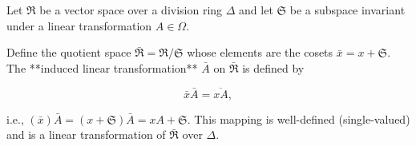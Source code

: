 Let $\Re$ be a vector space over a division ring $\Delta$ and let $\mathfrak{S}$ be a subspace invariant under a linear transformation $A \in \Omega$.

Define the quotient space $\bar{\Re} = \Re / \mathfrak{S}$ whose elements are the cosets $\bar{x} = x + \mathfrak{S}$.  The **induced linear transformation** $\bar{A}$ on $\bar{\Re}$ is defined by

$$\bar{x} \bar{A} = \overline{xA},$$

i.e., $(\bar{x})\bar{A} = (x + \mathfrak{S})\bar{A} = xA + \mathfrak{S}$.  This mapping is well-defined (single-valued) and is a linear transformation of $\bar{\Re}$ over $\Delta$.
